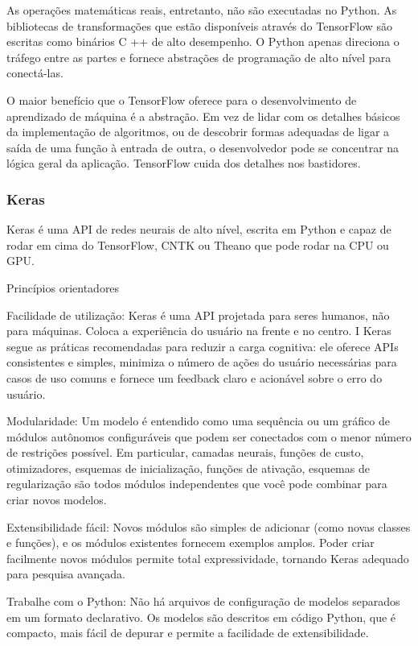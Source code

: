 As operações matemáticas reais, entretanto, não são executadas no Python. As bibliotecas de transformações que estão disponíveis através do TensorFlow são escritas como binários C ++ de alto desempenho. O Python apenas direciona o tráfego entre as partes e fornece abstrações de programação de alto nível para conectá-las.

O maior benefício que o TensorFlow oferece para o desenvolvimento de aprendizado de máquina é a abstração. Em vez de lidar com os detalhes básicos da implementação de algoritmos, ou de descobrir formas adequadas de ligar a saída de uma função à entrada de outra, o desenvolvedor pode se concentrar na lógica geral da aplicação. TensorFlow cuida dos detalhes nos bastidores.


\subsubsection{Keras}
Keras é uma API de redes neurais de alto nível, escrita em Python e capaz de rodar em cima do TensorFlow, CNTK ou Theano que pode rodar na CPU ou GPU.

Princípios orientadores

Facilidade de utilização: Keras é uma API projetada para seres humanos, não para máquinas. Coloca a experiência do usuário na frente e no centro. I Keras segue as práticas recomendadas para reduzir a carga cognitiva: ele oferece APIs consistentes e simples, minimiza o número de ações do usuário necessárias para casos de uso comuns e fornece um feedback claro e acionável sobre o erro do usuário.

Modularidade: Um modelo é entendido como uma sequência ou um gráfico de módulos autônomos configuráveis que podem ser conectados com o menor número de restrições possível. Em particular, camadas neurais, funções de custo, otimizadores, esquemas de inicialização, funções de ativação, esquemas de regularização são todos módulos independentes que você pode combinar para criar novos modelos.

Extensibilidade fácil: Novos módulos são simples de adicionar (como novas classes e funções), e os módulos existentes fornecem exemplos amplos. Poder criar facilmente novos módulos permite total expressividade, tornando Keras adequado para pesquisa avançada.

Trabalhe com o Python: Não há arquivos de configuração de modelos separados em um formato declarativo. Os modelos são descritos em código Python, que é compacto, mais fácil de depurar e permite a facilidade de extensibilidade.

